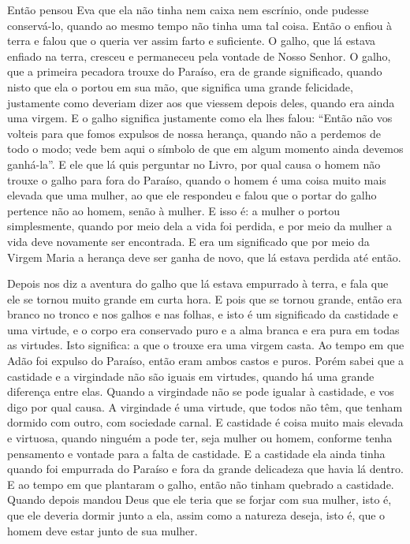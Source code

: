 Então pensou Eva que ela não tinha nem caixa nem escrínio, onde pudesse
conservá-lo, quando ao mesmo tempo não tinha uma tal coisa. Então o enfiou à
terra e falou que o queria ver assim farto e suficiente. O galho, que lá estava
enfiado na terra, cresceu e permaneceu pela vontade de Nosso Senhor. O galho,
que a primeira pecadora trouxe do Paraíso, era de grande significado, quando
nisto que ela o portou em sua mão, que significa uma grande felicidade,
justamente como deveriam dizer aos que viessem depois deles, quando era ainda
uma virgem. E o galho significa justamente como ela lhes falou: “Então não vos
volteis para que fomos expulsos de nossa herança, quando não a perdemos de todo
o modo; vede bem aqui o símbolo de que em algum momento ainda devemos
ganhá-la”. E ele que lá quis perguntar no Livro, por qual causa o homem não
trouxe o galho para fora do Paraíso, quando o homem é uma coisa muito mais
elevada que uma mulher, ao que ele respondeu e falou que o portar do galho
pertence não ao homem, senão à mulher. E isso é: a mulher o portou
simplesmente, quando por meio dela a vida foi perdida, e por meio da mulher a
vida deve novamente ser encontrada. E era um significado que por meio da Virgem
Maria a herança deve ser ganha de novo, que lá estava perdida até então.

Depois nos diz a aventura do galho que lá estava empurrado à terra, e fala que
ele se tornou muito grande em curta hora. E pois que se tornou grande, então era
branco no tronco e nos galhos e nas folhas, e isto é um significado da castidade
e uma virtude, e o corpo era conservado puro e a alma branca e era pura em
todas as virtudes. Isto significa: a que o trouxe era uma virgem casta. Ao
tempo em que Adão foi expulso do Paraíso, então eram ambos castos e puros.
Porém sabei que a castidade e a virgindade não são iguais em virtudes, quando
há uma grande diferença entre elas. Quando a virgindade não se pode igualar à
castidade, e vos digo por qual causa. A virgindade é uma virtude, que todos não
têm, que tenham dormido com outro, com sociedade carnal. E castidade é coisa
muito mais elevada e virtuosa, quando ninguém a pode ter, seja mulher ou homem,
conforme tenha pensamento e vontade para a falta de castidade. E a castidade
ela ainda tinha quando foi empurrada do Paraíso e fora da grande delicadeza que
havia lá dentro. E ao tempo em que plantaram o galho, então não tinham quebrado
a castidade. Quando depois mandou Deus que ele teria que se forjar com sua
mulher, isto é, que ele deveria dormir junto a ela, assim como a natureza
deseja, isto é, que o homem deve estar junto de sua mulher.

